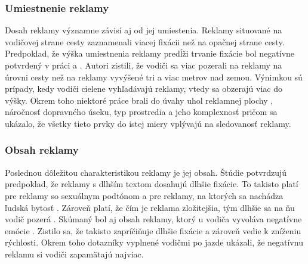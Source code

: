 \subsubsection{Umiestnenie reklamy}

Dosah reklamy významne závisí aj od jej umiestenia. Reklamy situované na vodičovej strane cesty zaznamenali viacej fixácii než na opačnej strane cesty. Predpoklad, že výška umiestnenia reklamy predĺži trvanie fixácie bol negatívne potvrdený v práci \cite{costa} a \cite{crundall}. Autori zistili, že vodiči sa viac pozerali na reklamy na úrovni cesty než na reklamy vyvýšené tri a viac metrov nad zemou. Výnimkou sú prípady, kedy vodiči cielene vyhľadávajú reklamy, vtedy sa obzerajú viac do výšky. Okrem toho niektoré práce brali do úvahy uhol reklamnej plochy \cite{zalesinska2018impact}, náročnosť dopravného úseku, typ prostredia a jeho komplexnosť \cite{costa, mollu2018driving} pričom sa ukázalo, že všetky tieto prvky do istej miery vplývajú na sledovanosť reklamy.

\subsubsection{Obsah reklamy}

Poslednou dôležitou charakteristikou reklamy je jej obsah. Štúdie \cite{harasimczuk2021longer, meuleners2020identifying} potvrdzujú predpoklad, že reklamy s dlhším textom dosahujú dlhšie fixácie. To takisto platí pre reklamy so sexuálnym podtónom \cite{MaliszewskiNorbert2019Iosa} a pre reklamy, na ktorých sa nachádza ľudská bytosť \cite{tarnowski2017roadside}. Zároveň platí, že čím je reklama zložitejšia, tým dlhšie sa na ňu vodič pozerá \cite{marciano2017effect}. Skúmaný bol aj obsah reklamy, ktorý u vodiča vyvoláva negatívne emócie \cite{chan2013emotional}. Zistilo sa, že takisto zapríčiňuje dlhšie fixácie a zároveň vedie k zníženiu rýchlosti. Okrem toho dotazníky vyplnené vodičmi po jazde ukázali, že negatívnu reklamu si vodiči zapamätajú najviac.



